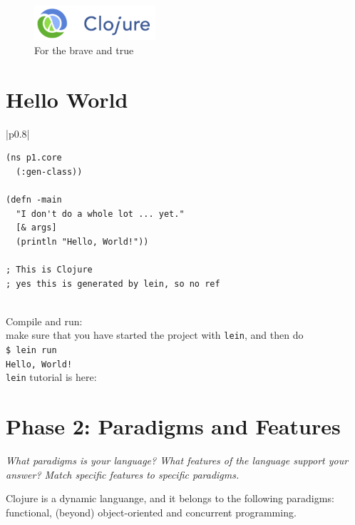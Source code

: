 \documentclass[12pt]{article}
\begin{document}
\tableofcontents








\begin{figure}[] 
\centering
\includegraphics[width = 0.4\textwidth]{c}
\caption{For the brave and true}
\label{fig:my_label}
\end{figure}



\section{Hello World}
\noindent
\begin{tabular}{|p{}|}
\hline
\begin{verbatim}
(ns p1.core
  (:gen-class))

(defn -main
  "I don't do a whole lot ... yet."
  [& args]
  (println "Hello, World!"))

; This is Clojure
; yes this is generated by lein, so no ref
\end{verbatim}
\\
\hline
Compile and run: \\make sure that you have started the project with \texttt{lein}, and then do\\
\texttt{\$ lein run}\\
\texttt{Hello, World!}\\
\hline
\texttt{lein} tutorial is here: \cite{1_github_2015}\\
\hline
\end{tabular}




\section{Phase 2: Paradigms and Features}


{\it What paradigms is your language? What features of the language support your answer? Match specific features to specific paradigms. }

\vspace{10pt}

Clojure is a dynamic languange, and it belongs to the following paradigms: functional, (beyond) object-oriented and concurrent programming.
\end{document}
